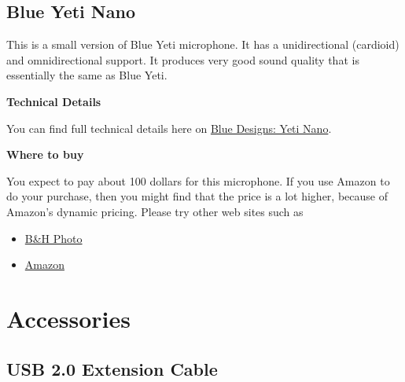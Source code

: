 \subsection{Blue Yeti Nano}
\label{sec:blueyetinano}

\begin{gram}
\label{grm:blueyetinano::main}
%
This is a small version of Blue Yeti microphone.
%
It has a unidirectional (cardioid) and omnidirectional support.
%
It produces very good sound quality that is essentially the same as Blue Yeti.


\textbf{Technical Details}

You can find full technical details here on \href{https://www.bluedesigns.com/products/yeti-nano/}{Blue Designs: Yeti Nano}.


\textbf{Where to buy}

You expect to pay about 100 dollars for this microphone.  If you use Amazon to do your purchase, then you might find that the price is a lot higher, because of Amazon's dynamic pricing.  Please try other web sites such as 

\begin{itemize}
\item
\href{https://www.bhphotovideo.com/c/l-search?q=Blue%20Yeti%20Nano&N=0}{B\&H Photo}
\item 
\href{https://www.amazon.com/Blue-Yeti-Premium-Recording-Streaming/dp/B07DTTGZ7M}{Amazon}
\end{itemize}
\end{gram}

\begin{gram}
\end{gram}


\section{Accessories}
\label{sec:accessories}

\subsection{USB 2.0 Extension Cable}
\label{sec:accessories::usbextend}

